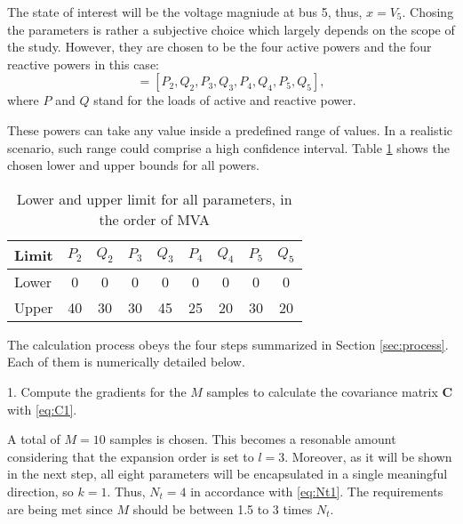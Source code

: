 The state of interest will be the voltage magniude at bus 5, thus, $x=V_5$. Chosing the parameters is rather a subjective choice which largely depends on the scope of the study. However, they are chosen to be the four active powers and the four reactive powers in this case:
\begin{equation}
  [p_1,p_2,p_3,p_4,p_5,p_6,p_7,p_8] = [P_2,Q_2,P_3,Q_3,P_4,Q_4,P_5,Q_5],
  \label{eq:params}
\end{equation}
where $P$ and $Q$ stand for the loads of active and reactive power. 

These powers can take any value inside a predefined range of values. In a realistic scenario, such range could comprise a high confidence interval. Table \ref{tab:lowup} shows the chosen lower and upper bounds for all powers.  

\begin{table}[!htb]
  \centering
  \begin{tabular}{lcccccccc}
    \hline
    Limit & $P_2$ & $Q_2$ & $P_3$ & $Q_3$ & $P_4$ & $Q_4$ & $P_5$ & $Q_5$ \\
    \hline
    Lower & 0 & 0 & 0 & 0 & 0 & 0 & 0 & 0 \\
    Upper & 40 & 30 & 30 & 45 & 25 & 20 & 30 & 20 \\
    \hline
  \end{tabular}
  \caption{Lower and upper limit for all parameters, in the order of MVA}
  \label{tab:lowup}
\end{table}
The calculation process obeys the four steps summarized in Section \ref{sec:process}. Each of them is numerically detailed below. 

\hspace{0.32cm} 1. Compute the gradients for the $M$ samples to calculate the covariance matrix $\mathbf{C}$ with \eqref{eq:C1}. 

A total of $M=10$ samples is chosen. This becomes a resonable amount considering that the expansion order is set to $l=3$. Moreover, as it will be shown in the next step, all eight parameters will be encapsulated in a single meaningful direction, so $k=1$. Thus, $N_t = 4$ in accordance with \eqref{eq:Nt1}. The requirements are being met since $M$ should be between 1.5 to 3 times $N_t$.

